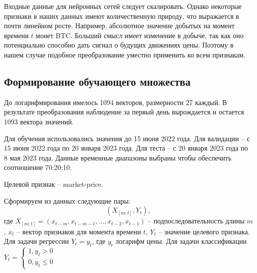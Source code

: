 \documentclass[diploma]{nanolab2015}
\begin{document}
Входные данные для нейронных сетей следует скалировать. Однако некоторые признаки в наших данных имеют количественную природу, что выражается в почти линейном росте. Например, абсолютное значение добытых на момент времени $t$ монет BTC. Больший смысл имеет изменение в добыче, так как оно потенциально способно дать сигнал о будущих движениях цены. Поэтому в нашем случае подобное преобразование уместно применить ко всем признакам.

\subsection{Формирование обучающего множества}
До логарифмирования имелось 1094 векторов, размерности 27 каждый. В результате преобразования наблюдение за первый день вырождается и остается 1093 вектора значений.

Для обучения использовались значения до 15 июня 2022 года. Для валидации -- с 15 июня 2022 года по 20 января 2023 года. Для теста -- с 20 января 2023 года по 8 мая 2023 года. Данные временные диапазоны выбраны чтобы обеспечить соотношение 70:20:10.

Целевой признак -- market-price.

Сформируем из данных следующие пары:
$$
    (X_{[m;t]}, Y_{t}),
$$
где $X_{[m;t]} = (x_{t-m}, x_{t-m-1}, ... , x_{t-2}, x_{t-1})$ -- подпоследовательность длины $m$, $x_t$ -- вектор признаков для момента времени $t$, $Y_t$ -- значение целевого признака.
Для задачи регрессии $Y_t = y_t$, где $y_t$ логарифм цены. Для задачи классификации
$
    Y_t =
    \begin{cases}
        1, y_t > 0 \\
        0, y_t \le 0
    \end{cases}
$

\renewcommand\theadalign{ll}
\end{document}
